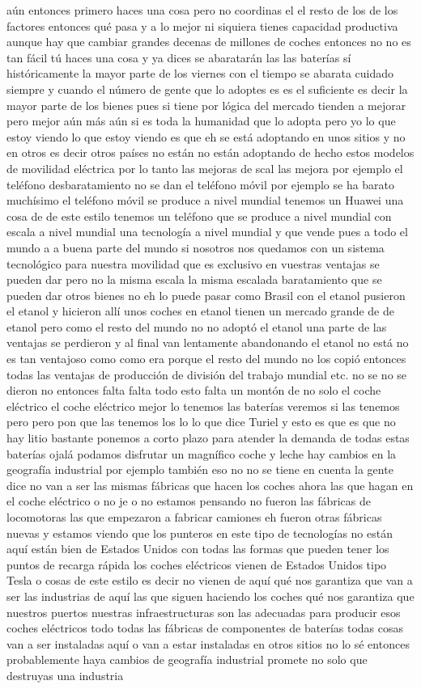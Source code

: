 aún entonces primero haces una cosa pero no coordinas el el resto de los de los factores entonces qué pasa y a lo mejor ni siquiera tienes capacidad productiva aunque hay que cambiar grandes decenas de millones de coches entonces no no es tan fácil tú haces una cosa y ya dices se abaratarán las las baterías sí históricamente la mayor parte de los viernes con el tiempo se abarata cuidado siempre y cuando el número de gente que lo adoptes es es el suficiente es decir la mayor parte de los bienes pues si tiene por lógica del mercado tienden a mejorar pero mejor aún más aún si es toda la humanidad que lo adopta pero yo lo que estoy viendo lo que estoy viendo es que eh se está adoptando en unos sitios y no en otros es decir otros países no están no están adoptando de hecho estos modelos de movilidad eléctrica por lo tanto las mejoras de scal las mejora por ejemplo el teléfono desbaratamiento no se dan el teléfono móvil por ejemplo se ha barato muchísimo el teléfono móvil se produce a nivel mundial tenemos un Huawei una cosa de de este estilo tenemos un teléfono que se produce a nivel mundial con escala a nivel mundial una tecnología a nivel mundial y que vende pues a todo el mundo a a buena parte del mundo si nosotros nos quedamos con un sistema tecnológico para nuestra movilidad que es exclusivo en vuestras ventajas se pueden dar pero no la misma escala la misma escalada baratamiento que se pueden dar otros bienes no eh lo puede pasar como Brasil con el etanol pusieron el etanol y hicieron allí unos coches en etanol tienen un mercado grande de de etanol pero como el resto del mundo no no adoptó el etanol una parte de las ventajas se perdieron y al final van lentamente abandonando el etanol no está no es tan ventajoso como como era porque el resto del mundo no los copió entonces todas las ventajas de producción de división del trabajo mundial etc. no se no se dieron no entonces falta falta todo esto falta un montón de no solo el coche eléctrico el coche eléctrico mejor lo tenemos las baterías veremos si las tenemos pero pero pon que las tenemos los lo lo que dice Turiel y esto es que es que no hay litio bastante ponemos a corto plazo para atender la demanda de todas estas baterías ojalá podamos disfrutar un magnífico coche y leche hay cambios en la geografía industrial por ejemplo también eso no no se tiene en cuenta la gente dice no van a ser las mismas fábricas que hacen los coches ahora las que hagan en el coche eléctrico o no je o no estamos pensando no fueron las fábricas de locomotoras las que empezaron a fabricar camiones eh fueron otras fábricas nuevas y estamos viendo que los punteros en este tipo de tecnologías no están aquí están bien de Estados Unidos con todas las formas que pueden tener los puntos de recarga rápida los coches eléctricos vienen de Estados Unidos tipo Tesla o cosas de este estilo es decir no vienen de aquí qué nos garantiza que van a ser las industrias de aquí las que siguen haciendo los coches qué nos garantiza que nuestros puertos nuestras infraestructuras son las adecuadas para producir esos coches eléctricos todo todas las fábricas de componentes de baterías todas cosas van a ser instaladas aquí o van a estar instaladas en otros sitios no lo sé entonces probablemente haya cambios de geografía industrial promete no solo que destruyas una industria 